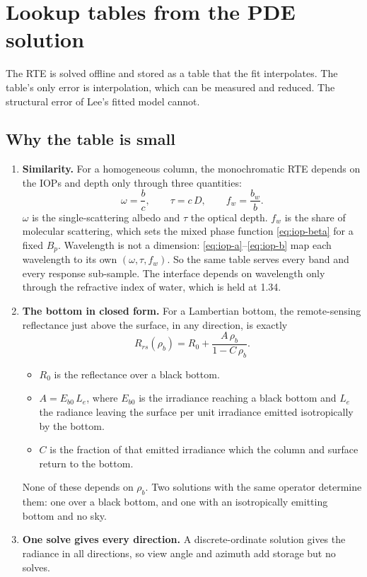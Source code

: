 \documentclass[11pt]{article}
\numberwithin{equation}{section}
\begin{document}
\section{Lookup tables from the PDE solution}\label{sec:lut}

The RTE is solved offline and stored as a table that the fit interpolates. The table's only
error is interpolation, which can be measured and reduced. The structural error of Lee's
fitted model cannot.

\subsection{Why the table is small}

\begin{enumerate}
\item \textbf{Similarity.} For a homogeneous column, the monochromatic RTE depends on the IOPs and
depth only through three quantities:
\begin{equation}\label{eq:similarity}
\omega = \frac{b}{c}, \qquad \tau = c\,D, \qquad f_w = \frac{b_w}{b}.
\end{equation}
$\omega$ is the single-scattering albedo and $\tau$ the optical depth. $f_w$ is the share of
molecular scattering, which sets the mixed phase function \eqref{eq:iop-beta} for a fixed
$B_p$. Wavelength is not a dimension: \eqref{eq:iop-a}--\eqref{eq:iop-b} map each wavelength
to its own $(\omega,\tau,f_w)$. So the same table serves every band and every response
sub-sample. The interface depends on wavelength only through the refractive index of water,
which is held at 1.34.

\item \textbf{The bottom in closed form.} For a Lambertian bottom, the remote-sensing reflectance
just above the surface, in any direction, is exactly
\begin{equation}\label{eq:bottom-closed}
R_{rs}(\rho_b) = R_0 + \frac{A\,\rho_b}{1 - C\,\rho_b}.
\end{equation}
\begin{itemize}
\item $R_0$ is the reflectance over a black bottom.
\item $A = E_{b0}\,L_e$, where $E_{b0}$ is the irradiance reaching a black bottom and $L_e$ the
radiance leaving the surface per unit irradiance emitted isotropically by the bottom.
\item $C$ is the fraction of that emitted irradiance which the column and surface return to the
bottom.
\end{itemize}
None of these depends on $\rho_b$. Two solutions with the same operator determine them: one
over a black bottom, and one with an isotropically emitting bottom and no sky.

\item \textbf{One solve gives every direction.} A discrete-ordinate solution gives the radiance
in all directions, so view angle and azimuth add storage but no solves.
\end{enumerate}
\end{document}
